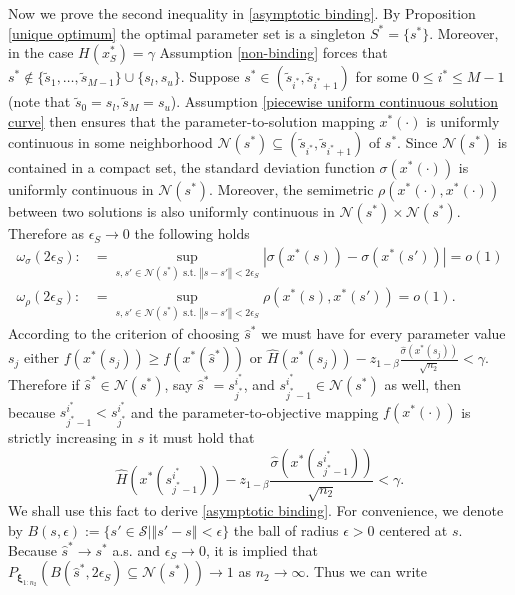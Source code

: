 \documentclass[mnsc,blindrev]{informs4} %
\newcommand{\norm}[1]{\left \Vert #1 \right\Vert}
\newcommand{\abs}[1]{\left \vert #1 \right\vert}
\begin{document}
Now we prove the second inequality in \eqref{asymptotic binding}. By Proposition \ref{unique optimum} the optimal parameter set is a singleton $S^*=\{s^*\}$. Moreover, in the case $H(x_S^*)=\gamma$ Assumption \ref{non-binding} forces that $s^*\notin \{\tilde s_1,\ldots,\tilde s_{M-1}\}\cup \{s_l,s_u\}$. Suppose $s^*\in(\tilde s_{i^*},\tilde s_{i^*+1})$ for some $0\leq i^*\leq M-1$ (note that $\tilde s_0=s_l,\tilde s_M=s_u$). Assumption \ref{piecewise uniform continuous solution curve} then ensures that the parameter-to-solution mapping $x^*(\cdot)$ is uniformly continuous in some neighborhood $\mathcal N(s^*)\subseteq (\tilde s_{i^*},\tilde s_{i^*+1})$ of $s^*$. Since $\mathcal N(s^*)$ is contained in a compact set, the standard deviation function $\sigma(x^*(\cdot))$ is uniformly continuous in $\mathcal N(s^*)$. Moreover, the semimetric $\rho(x^*(\cdot),x^*(\cdot))$ between two solutions is also uniformly continuous in $\mathcal N(s^*)\times \mathcal N(s^*)$. Therefore as $\epsilon_S\to 0$ the following holds
\begin{align*}
\omega_{\sigma}(2\epsilon_S):&=\sup_{s,s'\in\mathcal N(s^*)\text{ s.t. }\norm{s-s'}<2\epsilon_S}\abs{\sigma(x^*(s))-\sigma(x^*(s'))}=o(1)\\
\omega_{\rho}(2\epsilon_S):&=\sup_{s,s'\in\mathcal N(s^*)\text{ s.t. }\norm{s-s'}<2\epsilon_S}\rho(x^*(s),x^*(s'))=o(1).
\end{align*}
According to the criterion of choosing $\hat s^*$ we must have for every parameter value $s_j$ either $f(x^*(s_j))\geq f(x^*(\hat s^*))$ or $\hat H(x^*(s_j))-z_{1-\beta}\frac{\hat \sigma(x^*(s_j))}{\sqrt{n_2}}<\gamma$.
Therefore if $\hat s^*\in\mathcal N(s^*)$, say $\hat s^*=s^{i^*}_{j^*}$, and $s^{i^*}_{j^*-1}\in\mathcal N(s^*)$ as well, then because $s^{i^*}_{j^*-1}<s^{i^*}_{j^*}$ and the parameter-to-objective mapping $f(x^*(\cdot))$ is strictly increasing in $s$ it must hold that
\begin{equation}\label{theorem of the alternative}
\hat H(x^*(s^{i^*}_{j^*-1}))-z_{1-\beta}\frac{\hat \sigma(x^*(s^{i^*}_{j^*-1}))}{\sqrt{n_2}}<\gamma.
\end{equation}
We shall use this fact to derive \eqref{asymptotic binding}. For convenience, we denote by $B(s,\epsilon):=\{s'\in\mathcal S\vert \norm{s'-s}<\epsilon\}$ the ball of radius $\epsilon>0$ centered at $s$. Because $\hat s^*\to s^*$ a.s. and $\epsilon_S\to 0$, it is implied that $P_{\bm{\xi}_{1:n_2}}(B(\hat s^*,2\epsilon_S)\subseteq \mathcal N(s^*)) \to 1$ as $n_2\to\infty$. Thus we can write
\end{document}
